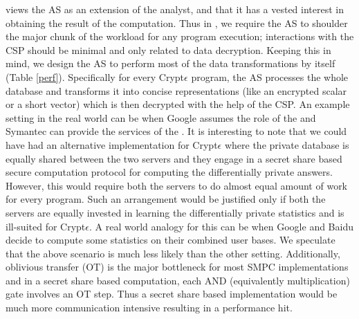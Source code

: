 { \system views the \textsf{AS} as an extension of the analyst, and that it has a vested interest in obtaining the result of the computation.   Thus in \system, we require the \textsf{AS} to  shoulder the major chunk of the workload for any \system program execution; interactions with the \textsf{CSP} should be minimal and only related to data decryption. Keeping this in  mind, we design the \textsf{AS} to perform most of the data transformations by itself (Table \ref{perf}). Specifically for every Crypt$\epsilon$ program, the \textsf{AS} processes the whole database and transforms it into concise representations (like an encrypted scalar or a short vector) which is then decrypted with the help of the \textsf{CSP}. An example setting in the real world can be when Google assumes the role of the \AS and Symantec can provide the services of the \CSP. It is interesting to note that we could have had an alternative implementation for Crypt$\epsilon$ where the private database is equally shared between the two servers and they engage in a secret share based secure computation protocol for computing the differentially private answers. However, this would require both the servers to do almost equal amount of work for every program. Such an arrangement would be justified only if both the servers are equally invested in learning the differentially private statistics and is ill-suited for Crypt$\epsilon$. A real world analogy for this can be when Google and Baidu decide to compute some statistics on their combined user bases. We speculate that the above scenario is much less likely than the other setting. Additionally, oblivious transfer (OT) is the major bottleneck for most SMPC implementations \cite{OT:bottleneck:1,OT:bottleneck:2,OT:bottleneck:3} and in a secret share based computation, each AND (equivalently multiplication) gate involves an OT step. Thus a secret share based implementation would be much more communication intensive resulting in a performance hit. 

}
